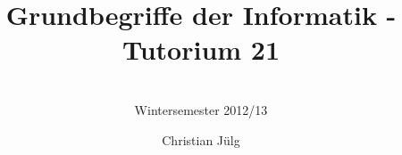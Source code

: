 
\title[GBI Tutorium 21]{Grundbegriffe der Informatik - Tutorium 21}%
\subtitle{
\insertauthor 
\\
Wintersemester 2012/13
\\
\insertdate 
}
\author[\hspace{1.5em}Christian Jülg]{Christian Jülg}
